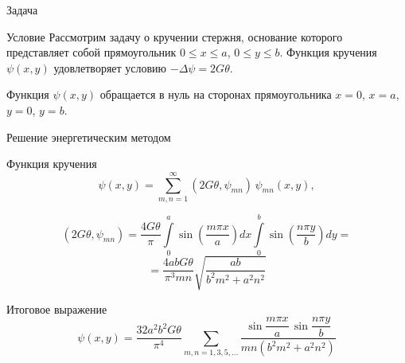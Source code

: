 \documentclass[ignoreonframetext,unicode]{beamer}
\begin{document}
\begin{frame}{Задача}
	
		\begin{block}{Условие}
		Рассмотрим задачу о кручении стержня, основание которого представляет собой   прямоугольник
		$0 \leqslant x \leqslant a$, $0 \leqslant y \leqslant b$.
		Функция кручения $\psi(x, y)$ удовлетворяет условию $-\Delta \psi = 2 G \theta$.
		
		Функция $\psi(x, y)$ обращается в нуль на
		сторонах прямоугольника $x= 0$, $x = a$, $y = 0$, $y = b$.
		\end{block}
	
\end{frame}

\begin{frame}{Решение энергетическим методом}
	\begin{block}{Функция кручения}	
		\[
		\psi(x, y) = \sum_{m, n = 1}^\infty (2G \theta, \psi_{mn}) \, \psi_{mn}(x, y),
		\]
	\end{block}
		\begin{block}{}
	\[
	(2G \theta, \psi_{mn}) = \frac{4 G \theta}{\pi}\int\limits_0^a \sin\left(\frac{m \pi x}{a}\right) dx \int\limits_0^b
	\sin\left(\frac{n \pi y}{b}\right) dy = 
	\]
	\[
	= \frac{4abG\theta}{\pi^3 mn} \sqrt{\frac{ab}{b^2 m^2 + a^2 n^2}}
	\]
\end{block}
\begin{block}{Итоговое выражение}	
	\[
	\psi(x, y) = \frac{32 a^2 b^2 G\theta}{\pi^4} \!\!\! \sum_{m, n = 1, 3, 5, \ldots}
	\!\!\! \frac{\sin\dfrac{m\pi x}{a} \, \sin\dfrac{n\pi y}{b}}{mn(b^2 m^2 + a^2 n^2)}
	\]
\end{block}
\end{frame}
\end{document}
